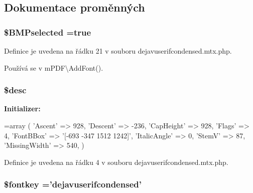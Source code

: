 \subsection{Dokumentace proměnných}
\hypertarget{dejavuserifcondensed_8mtx_8php_a67fd6f661058b6635618e65431505e9b}{
\subsubsection[{\$\-B\-M\-Pselected}]{\setlength{\rightskip}{0pt plus 5cm}\$B\-M\-Pselected =true}}\label{dejavuserifcondensed_8mtx_8php_a67fd6f661058b6635618e65431505e9b}


Definice je uvedena na řádku 21 v souboru dejavuserifcondensed.\-mtx.\-php.



Používá se v m\-P\-D\-F\textbackslash{}\-Add\-Font().

\hypertarget{dejavuserifcondensed_8mtx_8php_a31059b9e4d0c5af34df20da32232ea9a}{
\subsubsection[{\$desc}]{\setlength{\rightskip}{0pt plus 5cm}\$desc}}\label{dejavuserifcondensed_8mtx_8php_a31059b9e4d0c5af34df20da32232ea9a}
{\bfseries Initializer\-:}
\begin{DoxyCode}
=array (
  \textcolor{stringliteral}{'Ascent'} => 928,
  \textcolor{stringliteral}{'Descent'} => -236,
  \textcolor{stringliteral}{'CapHeight'} => 928,
  \textcolor{stringliteral}{'Flags'} => 4,
  \textcolor{stringliteral}{'FontBBox'} => \textcolor{stringliteral}{'[-693 -347 1512 1242]'},
  \textcolor{stringliteral}{'ItalicAngle'} => 0,
  \textcolor{stringliteral}{'StemV'} => 87,
  \textcolor{stringliteral}{'MissingWidth'} => 540,
)
\end{DoxyCode}


Definice je uvedena na řádku 4 v souboru dejavuserifcondensed.\-mtx.\-php.

\hypertarget{dejavuserifcondensed_8mtx_8php_a97b81cd1a67db21cdcae44cc49307a27}{
\subsubsection[{\$fontkey}]{\setlength{\rightskip}{0pt plus 5cm}\$fontkey ='dejavuserifcondensed'}}\label{dejavuserifcondensed_8mtx_8php_a97b81cd1a67db21cdcae44cc49307a27}


